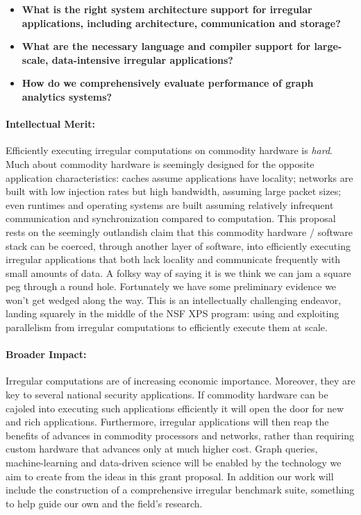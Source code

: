 \begin{itemize}
\item \textbf{What is the right system architecture support for irregular applications, including architecture, communication and storage?}
\item \textbf{What are the necessary language and compiler support for large-scale, data-intensive irregular applications?}
\item \textbf{How do we comprehensively evaluate performance of graph analytics systems?}
\end{itemize}

\paragraph{Intellectual Merit:}

Efficiently executing irregular computations on commodity hardware is \emph{hard}.  Much about commodity hardware is seemingly designed for the opposite application characteristics: caches assume applications have locality; networks are built with low injection rates but high bandwidth, assuming large packet sizes; even runtimes and operating systems are built assuming relatively infrequent communication and synchronization compared to computation.  This proposal rests on the seemingly outlandish claim that this commodity hardware / software stack can be coerced, through another layer of software, into efficiently executing irregular applications that both lack locality and communicate frequently with small amounts of data.  A folksy way of saying it is we think we can jam a square peg through a round hole.  Fortunately we have some preliminary evidence we won't get wedged along the way.  This is an intellectually challenging endeavor, landing squarely in the middle of the NSF XPS program: using and exploiting parallelism from irregular computations to efficiently execute them at scale.

\paragraph{Broader Impact:}

Irregular computations are of increasing economic importance.  Moreover, they are key to several national security applications.  If commodity hardware can be cajoled into executing such applications efficiently it will open the door for new and rich applications.  Furthermore, irregular applications will then reap the benefits of advances in commodity processors and networks, rather than requiring custom hardware that advances only at much higher cost.  Graph queries, machine-learning and data-driven science will be enabled by the technology we aim to create from the ideas in this grant proposal.  In addition our work will include the construction of a comprehensive irregular benchmark suite, something to help guide our own and the field's research.


